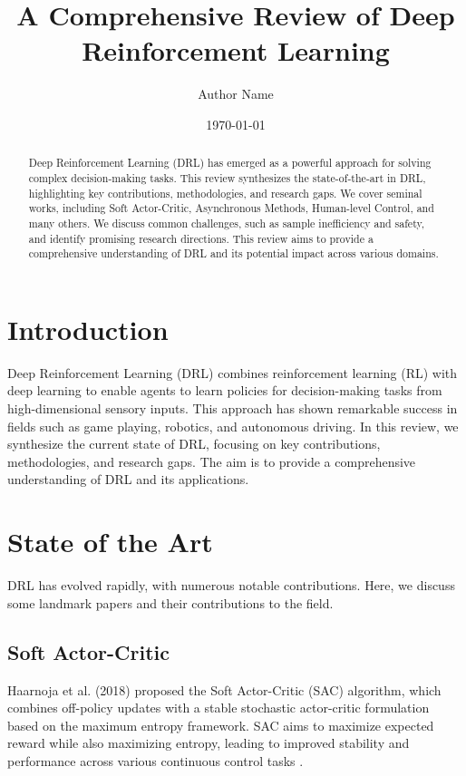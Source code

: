 \documentclass{article}
\title{A Comprehensive Review of Deep Reinforcement Learning}
\author{Author Name}
\date{\today}
\begin{document}
\maketitle

\begin{abstract}
Deep Reinforcement Learning (DRL) has emerged as a powerful approach for solving complex decision-making tasks. This review synthesizes the state-of-the-art in DRL, highlighting key contributions, methodologies, and research gaps. We cover seminal works, including Soft Actor-Critic, Asynchronous Methods, Human-level Control, and many others. We discuss common challenges, such as sample inefficiency and safety, and identify promising research directions. This review aims to provide a comprehensive understanding of DRL and its potential impact across various domains.
\end{abstract}

\section{Introduction}
Deep Reinforcement Learning (DRL) combines reinforcement learning (RL) with deep learning to enable agents to learn policies for decision-making tasks from high-dimensional sensory inputs. This approach has shown remarkable success in fields such as game playing, robotics, and autonomous driving. In this review, we synthesize the current state of DRL, focusing on key contributions, methodologies, and research gaps. The aim is to provide a comprehensive understanding of DRL and its applications.

\section{State of the Art}
DRL has evolved rapidly, with numerous notable contributions. Here, we discuss some landmark papers and their contributions to the field.

\subsection{Soft Actor-Critic}
Haarnoja et al. (2018) proposed the Soft Actor-Critic (SAC) algorithm, which combines off-policy updates with a stable stochastic actor-critic formulation based on the maximum entropy framework. SAC aims to maximize expected reward while also maximizing entropy, leading to improved stability and performance across various continuous control tasks \cite{haarnoja2018soft}.
\end{document}
